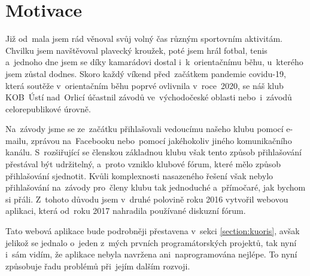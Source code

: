 \section{Motivace}\label{section:motivation}
Již od~mala jsem rád věnoval svůj volný čas různým sportovním aktivitám. Chvilku jsem navštěvoval plavecký kroužek, poté jsem hrál fotbal, tenis a~jednoho dne jsem se díky kamarádovi dostal i~k~orientačnímu běhu, u~kterého jsem zůstal dodnes. Skoro každý víkend před~začátkem pandemie covidu-19, která soutěže v~orientačním běhu poprvé ovlivnila v~roce~2020, se náš klub KOB~Ústí nad~Orlicí účastnil závodů ve~východočeské oblasti nebo~i~závodů celorepublikové úrovně.

Na~závody jsme se ze~začátku přihlašovali vedoucímu našeho klubu pomocí e-mailu, zprávou na~Facebooku nebo~pomocí jakéhokoliv jiného komunikačního kanálu. S~rozšiřující se členskou základnou klubu však tento způsob přihlašování přestával být udržitelný, a~proto vzniklo klubové fórum, které mělo způsob přihlašování sjednotit. Kvůli komplexnosti nasazeného řešení však nebylo přihlašování na~závody pro~členy klubu tak jednoduché a~přímočaré, jak bychom si přáli. Z~tohoto důvodu jsem v~druhé polovině roku 2016 vytvořil webovou aplikaci, která od~roku 2017 nahradila používané diskuzní fórum.

Tato webová aplikace bude podrobněji přestavena v~sekci \ref{section:kuoris}, avšak jelikož se jednalo o~jeden z~mých prvních programátorských projektů, tak nyní i~sám vidím, že aplikace nebyla navržena ani~naprogramována nejlépe. To nyní způsobuje řadu problémů při~jejím dalším rozvoji.
